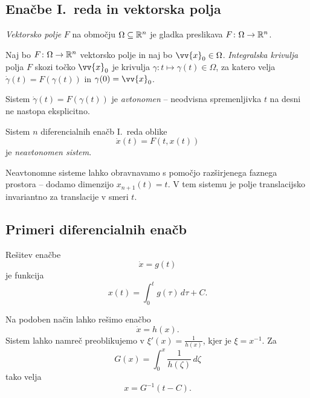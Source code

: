 \newpage

\subsection{Enačbe I.~reda in vektorska polja}

\begin{definicija}
\emph{Vektorsko polje} $F$ na območju
$\Omega \subseteq \mathbb{R}^n$ je gladka preslikava
$F \colon \Omega \to \mathbb{R}^n$.
\end{definicija}

\begin{definicija}
Naj bo $F \colon \Omega \to \mathbb{R}^n$ vektorsko polje in naj bo
$\vv{x}_0 \in \Omega$.
\emph{Integralska krivulja} polja $F$
skozi točko $\vv{x}_0$ je krivulja
$\gamma \colon t \mapsto \gamma(t) \in \Omega$, za katero velja
$\dot{\gamma}(t) = F(\gamma(t))$ in $\gamma(0) = \vv{x}_0$.
\end{definicija}


\begin{opomba}
Sistem $\dot{\gamma}(t) = F(\gamma(t))$ je \emph{avtonomen} --
neodvisna spremenljivka $t$ na desni ne nastopa eksplicitno.
\end{opomba}

\begin{definicija}
Sistem $n$ diferencialnih enačb I.~reda oblike
\[
\dot{x}(t) = F(t, x(t))
\]
je
\emph{neavtonomen sistem}.
\end{definicija}

\begin{opomba}
Neavtonomne sisteme lahko obravnavamo s pomočjo razširjenega
faznega prostora -- dodamo dimenzijo $x_{n+1}(t) = t$. V tem
sistemu je polje translacijsko invariantno za translacije v smeri
$t$.
\end{opomba}

\newpage

\subsection{Primeri diferencialnih enačb}

\begin{primer}
Rešitev enačbe
\[
\dot{x} = g(t)
\]
je funkcija
\[
x(t) = \int_0^t g(\tau)\,d\tau + C.
\]
\end{primer}

\begin{primer}
Na podoben način lahko rešimo enačbo
\[
\dot{x} = h(x).
\]
Sistem lahko namreč preoblikujemo v $\xi'(x) = \frac{1}{h(x)}$,
kjer je $\xi = x^{-1}$. Za
\[
G(x) = \int_0^x \frac{1}{h(\zeta)}\,d\zeta
\]
tako velja
\[
x = G^{-1}(t-C).
\]
\end{primer}

